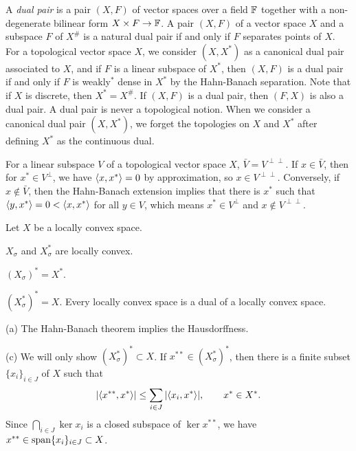\documentclass{../../large}
\begin{document}
\begin{prb}
A \emph{dual pair} is a pair $(X,F)$ of vector spaces over a field $\mathbb{F}$ together with a non-degenerate bilinear form $X\times F\to\mathbb{F}$.
A pair $(X,F)$ of a vector space $X$ and a subspace $F$ of $X^\#$ is a natural dual pair if and only if $F$ separates points of $X$.
For a topological vector space $X$, we consider $(X,X^*)$ as a canonical dual pair associated to $X$, and if $F$ is a linear subspace of $X^*$, then $(X,F)$ is a dual pair if and only if $F$ is weakly$^*$ dense in $X^*$ by the Hahn-Banach separation.
Note that if $X$ is discrete, then $X^*=X^\#$.
If $(X,F)$ is a dual pair, then $(F,X)$ is also a dual pair.
A dual pair is never a topological notion.
When we consider a canonical dual pair $(X,X^*)$, we forget the topologies on $X$ and $X^*$ after defining $X^*$ as the continuous dual.
\end{prb}

\begin{pf}
For a linear subspace $V$ of a topological vector space $X$, $\bar V=V^{\perp\perp}$.
If $x\in\bar V$, then for $x^*\in V^\perp$, we have $\langle x,x^*\rangle=0$ by approximation, so $x\in V^{\perp\perp}$.
Conversely, if $x\notin\bar V$, then the Hahn-Banach extension implies that there is $x^*$ such that $\langle y,x^*\rangle=0<\langle x,x^*\rangle$ for all $y\in V$, which means $x^*\in V^\perp$ and $x\notin V^{\perp\perp}$.

\end{pf}

\begin{prb}
Let $X$ be a locally convex space.
\begin{parts}
\item $X_\sigma$ and $X^*_\sigma$ are locally convex.
\item $(X_\sigma)^*=X^*$.
\item $(X^*_\sigma)^*=X$. Every locally convex space is a dual of a locally convex space.
\end{parts}
\end{prb}
\begin{pf}
(a)
The Hahn-Banach theorem implies the Hausdorffness.

(c)
We will only show $(X^*_\sigma)^*\subset X$.
If $x^{**}\in(X^*_\sigma)^*$, then there is a finite subset $\{x_i\}_{i\in J}$ of $X$ such that
\[|\langle x^{**},x^*\rangle|\le\sum_{i\in J}|\langle x_i,x^*\rangle|,\qquad x^*\in X^*.\]
Since $\bigcap_{i\in J}\ker x_i$ is a closed subspace of $\ker x^{**}$, we have $x^{**}\in\operatorname{span}\{x_i\}_{i\in J}\subset X$.
\end{pf}
\end{document}
